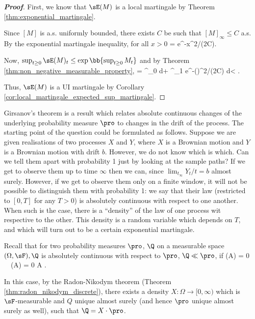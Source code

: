 \begin{proof}[\bf Proof]
First, we know that $\sE(M)$ is a local martingale by Theorem \ref{thm:exponential_martingale}.

Since $[M]$ is a.s. uniformly bounded, there exists $C$ be such that $[M]_\infty \leq C$ a.s. By the exponential martingale inequality, for all $x > 0$
\be
\pro{} = \pro{} \leq e^{-x^2/(2C)}.
\ee

Now, $\sup_{t\geq0} \sE(M)_t \leq \exp\bb{\sup_{t\geq0} M_t}$ and by Theorem \ref{thm:non_negative_measurable_property},
\be
\E{} \leq \E{} = \int^\infty_0 \pro{}d\lm {}+ \int^\infty_1 e^{-(\log \lm)^2/(2C)} d\lm < \infty.
\ee

Thus, $\sE(M)$ is a UI martingale by Corollary \ref{cor:local_martingale_expected_sup_martingale}. %
\end{proof}

Girsanov's theorem is a result which relates absolute continuous changes of the underlying probability measure $\pro$ to changes in the drift of the process.
The starting point of the question could be formulated as follows. Suppose we are given realisations of two processes $X$ and $Y$, where $X$ is a Brownian motion and $Y$ is a Brownian motion with drift $b$.
However, we do not know which is which. Can we tell them apart with probability 1 just by looking at the sample paths? If we get to observe them up to time $\infty$ then we can,
since $\lim_{t_\infty} Y_t/t = b$ almost surely. However, if we get to observe them only on a finite window, it will not be possible to distinguish them with probability 1:
we say that their law (restricted to $[0, T]$ for any $T > 0$) is absolutely continuous with respect to one another. When such is the case, there is a ``density'' of the law of one process wit respective to the other.
This density is a random variable which depends on $T$, and which will turn out to be a certain exponential martingale.

Recall that for two probability measures $\pro$, $\Q$ on a measurable space $(\Omega,\sF), \Q$ is absolutely continuous with respect to $\pro$, $\Q \ll \pro$, if
\be
\pro(A) = 0 \ \ra\ \Q(A) = 0 \quad{}A \in \sF.
\ee

In this case, by the Radon-Nikodym theorem (Theorem \ref{thm:radon_nikodym_discrete}), there exists a density $X: \Omega \to [0,\infty)$ which is $\sF$-measurable and $Q$ unique almost surely (and hence $\pro$ unique almost surely as well),
such that $\Q = X\cdot \pro$. %

